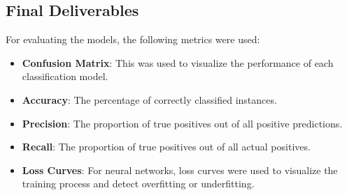 \documentclass[a4paper,11pt]{article}
\begin{document}
\subsection{Final Deliverables}
For evaluating the models, the following metrics were used:
\begin{itemize}
    \item \textbf{Confusion Matrix}: This was used to visualize the performance of each classification model.
    \item \textbf{Accuracy}: The percentage of correctly classified instances.
    \item \textbf{Precision}: The proportion of true positives out of all positive predictions.
    \item \textbf{Recall}: The proportion of true positives out of all actual positives.
    \item \textbf{Loss Curves}: For neural networks, loss curves were used to visualize the training process and detect overfitting or underfitting.
\end{itemize}
\end{document}
